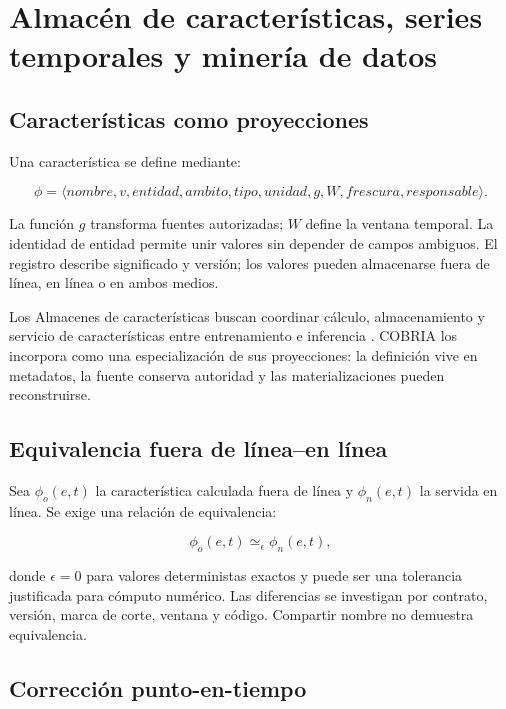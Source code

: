 \chapter{Almacén de características, series temporales y minería de datos}

\section{Características como proyecciones}

Una característica se define mediante:

\begin{equation}
\phi=\langle nombre,v,entidad,ambito,tipo,unidad,g,W,frescura,responsable\rangle.
\end{equation}

La función $g$ transforma fuentes autorizadas; $W$ define la ventana temporal. La
identidad de entidad permite unir valores sin depender de campos ambiguos. El registro
describe significado y versión; los valores pueden almacenarse fuera de línea, en línea o en
ambos medios.

Los Almacenes de características buscan coordinar cálculo, almacenamiento y servicio de
características entre entrenamiento e inferencia \parencite{orr2021featurestores,
li2023featurestore}. COBRIA los incorpora como una especialización de sus proyecciones:
la definición vive en metadatos, la fuente conserva autoridad y las materializaciones
pueden reconstruirse.

\section{Equivalencia fuera de línea--en línea}

Sea $\phi_o(e,t)$ la característica calculada fuera de línea y $\phi_n(e,t)$ la servida en línea.
Se exige una relación de equivalencia:

\begin{equation}
\phi_o(e,t)\simeq_{\epsilon}\phi_n(e,t),
\end{equation}

donde $\epsilon=0$ para valores deterministas exactos y puede ser una tolerancia
justificada para cómputo numérico. Las diferencias se investigan por contrato, versión,
marca de corte, ventana y código. Compartir nombre no demuestra equivalencia.

\section{Corrección punto-en-tiempo}

